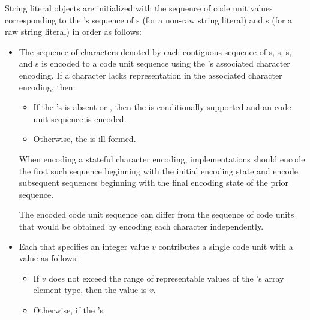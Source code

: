 \documentclass{wg21}
\begin{document}
\pnum
String literal objects are initialized with
the sequence of code unit values
corresponding to the 's sequence of
s (for a non-raw string literal) and
s (for a raw string literal)
in order as follows:
\begin{itemize}
    \item
    The sequence of characters denoted by each contiguous sequence of
    s,
    s,
    s, and
    s
    is encoded to a code unit sequence
    using the 's associated character encoding.
    If a character lacks representation in the associated character encoding, then:
    \begin{itemize}
        \item
        If the 's 
        is absent or ,
        then the  is conditionally-supported and
        an
        code unit sequence is encoded.
        \item
        Otherwise, the  is ill-formed.
    \end{itemize}
    When encoding a stateful character encoding,
    implementations should encode the first such sequence
    beginning with the initial encoding state and
    encode subsequent sequences
    beginning with the final encoding state of the prior sequence.
    \begin{note}
        The encoded code unit sequence can differ from
        the sequence of code units that would be obtained by
        encoding each character independently.
    \end{note}
    \item
    Each 
    that specifies an integer value $v$
    contributes a single code unit with a value as follows:
    \begin{itemize}
        \item
        If $v$ does not exceed the range of representable values of
        the 's array element type,
        then the value is $v$.
        \item
        Otherwise,
        if the 's 

\end{itemize}
\end{itemize}
\end{document}
